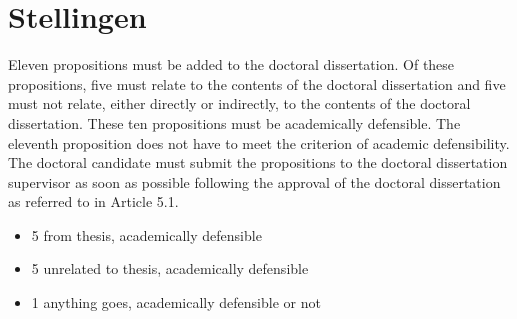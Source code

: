 \chapter*{Stellingen}

Eleven propositions must be added to the doctoral dissertation. Of these propositions,
five must relate to the contents of the doctoral dissertation and five must not relate,
either directly or indirectly, to the contents of the doctoral dissertation. These ten
propositions must be academically defensible. The eleventh proposition does not have
to meet the criterion of academic defensibility. The doctoral candidate must submit the
propositions to the doctoral dissertation supervisor as soon as possible following the
approval of the doctoral dissertation as referred to in Article 5.1.

\begin{itemize}
\item 5 from thesis, academically defensible
\item 5 unrelated to thesis, academically defensible
\item 1 anything goes, academically defensible or not
\end{itemize}

\begin{comment}
ideas

\begin{itemize}
\item Academia
    \begin{itemize}
     \item Scientists should write up results for general public as well as scientific journals
     \item Open science FTW, no more paywalled journals. or use money to pay peer reviewers to do thorough testing. or professional reviewers.
     \item Do we even need journals? system of completely open peer review could replace
     \item post-publication public peer review FTW
    \end{itemize}
\end{itemize}
\end{comment}
